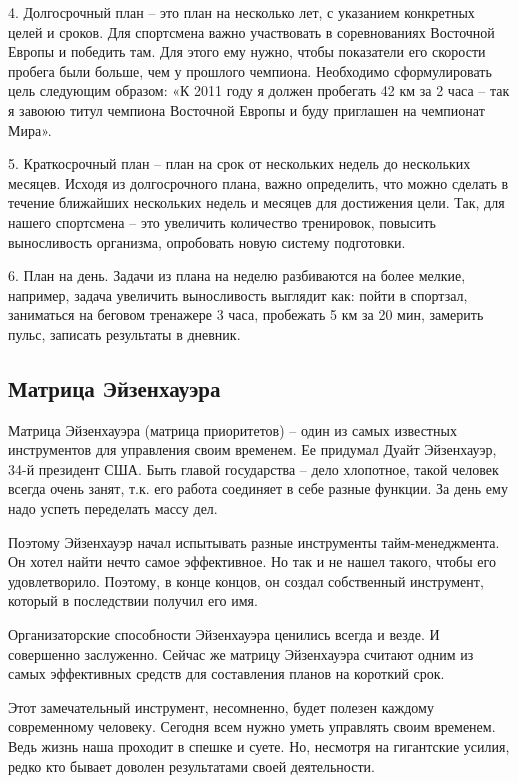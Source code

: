4. Долгосрочный план – это план на несколько лет, с указанием конкретных целей и сроков. Для спортсмена важно участвовать в соревнованиях Восточной Европы и победить там. Для этого ему нужно, чтобы показатели его скорости пробега были больше, чем у прошлого чемпиона. Необходимо сформулировать цель следующим образом: «К 2011 году я должен пробегать 42 км за 2 часа – так я завоюю титул чемпиона Восточной Европы и буду приглашен на чемпионат Мира». 

5. Краткосрочный план – план на срок от нескольких недель до нескольких месяцев. Исходя из долгосрочного плана, важно определить, что можно сделать в течение ближайших нескольких недель и месяцев для достижения цели. Так, для нашего спортсмена – это увеличить количество тренировок, повысить выносливость организма, опробовать новую систему подготовки. 

6. План на день. Задачи из плана на неделю разбиваются на более мелкие, например, задача увеличить выносливость выглядит как: пойти в спортзал, заниматься на беговом тренажере 3 часа, пробежать 5 км за 20 мин, замерить пульс, записать результаты в дневник.

\subsection{Матрица Эйзенхауэра}
Матрица Эйзенхауэра (матрица приоритетов) – один из самых известных инструментов для управления своим временем. Ее придумал Дуайт Эйзенхауэр, 34-й президент США. Быть главой государства – дело хлопотное, такой человек всегда очень занят, т.к. его работа соединяет в себе разные функции. За день ему надо успеть переделать массу дел.

Поэтому Эйзенхауэр начал испытывать разные инструменты тайм-менеджмента. Он хотел  найти нечто самое эффективное. Но так и не нашел такого, чтобы его удовлетворило. Поэтому, в конце концов, он создал собственный инструмент, который в последствии получил его имя.

Организаторские способности Эйзенхауэра ценились всегда и везде. И совершенно заслуженно. Сейчас же матрицу Эйзенхауэра считают одним из самых эффективных средств для составления планов на короткий срок.

Этот замечательный инструмент, несомненно, будет полезен каждому современному человеку. Сегодня всем нужно уметь управлять своим временем. Ведь жизнь наша проходит в спешке и суете. Но, несмотря на гигантские усилия, редко кто бывает доволен результатами своей деятельности.

